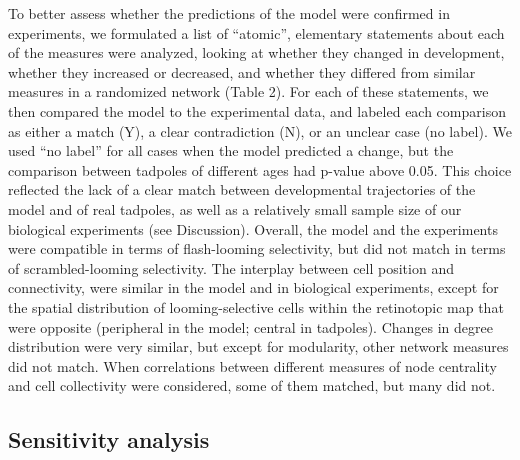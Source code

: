 \documentclass{article}
\begin{document}
To better assess whether the predictions of the model were confirmed in experiments, we formulated a list of “atomic”, elementary statements about each of the measures were analyzed, looking at whether they changed in development, whether they increased or decreased, and whether they differed from similar measures in a randomized network (Table 2). For each of these statements, we then compared the model to the experimental data, and labeled each comparison as either a match (Y), a clear contradiction (N), or an unclear case (no label). We used “no label” for all cases when the model predicted a change, but the comparison between tadpoles of different ages had p-value above 0.05. This choice reflected the lack of a clear match between developmental trajectories of the model and of real tadpoles, as well as a relatively small sample size of our biological experiments (see Discussion). Overall, the model and the experiments were compatible in terms of flash-looming selectivity, but did not match in terms of scrambled-looming selectivity. The interplay between cell position and connectivity, were similar in the model and in biological experiments, except for the spatial distribution of looming-selective cells within the retinotopic map that were opposite (peripheral in the model; central in tadpoles). Changes in degree distribution were very similar, but except for modularity, other network measures did not match. When correlations between different measures of node centrality and cell collectivity were considered, some of them matched, but many did not.

\subsection*{Sensitivity analysis}
\end{document}
